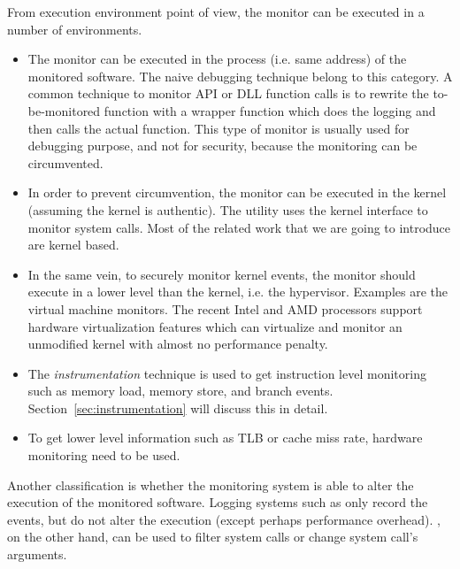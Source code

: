  From execution environment point of view, the monitor can be executed
in a number of environments.
\begin{itemize}
\item The monitor can be executed in the process (i.e. same address)
of the monitored software.
The naive  debugging technique belong to this category.
A common technique to monitor API or DLL function calls is to rewrite
the to-be-monitored function with a wrapper function which does the
logging and then calls the actual function.
This type of monitor is usually used for debugging purpose, and not for
security, because the monitoring can be circumvented.
\item In order to prevent circumvention,
the monitor can be executed in the kernel (assuming the kernel is authentic).
The  utility uses the kernel  interface
to monitor system calls.
Most of the related work that we are going to introduce are kernel based.
\item In the same vein, to securely monitor kernel events, the monitor
should execute in a lower level than the kernel, i.e. the hypervisor.
Examples are the virtual machine monitors.
The recent Intel and AMD processors support hardware virtualization
features which can virtualize and monitor an unmodified kernel with almost
no performance penalty.
\item The {\em instrumentation} technique is used to get instruction
level monitoring such as memory load, memory store, and branch events.
Section~\ref{sec:instrumentation} will discuss this in detail.
\item To get lower level information such as TLB or cache miss rate,
hardware monitoring need to be used.
\end{itemize}

Another classification is whether the monitoring system is able to
alter the execution of the monitored software.
Logging systems such as  only record the events,
but do not alter the execution (except perhaps performance overhead).
, on the other hand, can be used to filter system calls
or change system call's arguments.

